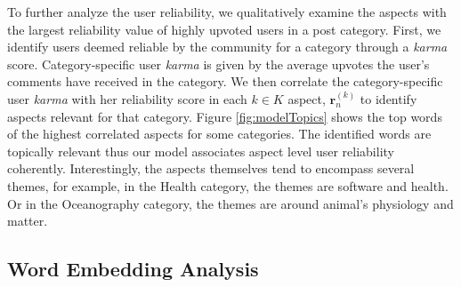 To further analyze the user reliability, we qualitatively examine the aspects with the largest reliability value of highly upvoted users in a post category. First, we identify users deemed reliable by the community for a category through a \emph{karma} score. Category-specific user \textit{karma} is given by the average upvotes the user's comments have received in the category.  We then correlate the category-specific user \textit{karma} with her reliability score in each $k \in K$ aspect, $\bm{r}_n^{(k)}$ to identify aspects relevant for that category.
Figure \ref{fig:modelTopics} shows the top words of the highest correlated aspects for some categories. The identified words are topically relevant thus our model associates aspect level user reliability coherently.
Interestingly, the aspects themselves tend to encompass several themes, for example, in the Health category, the themes are software and health. Or in the Oceanography category, the themes are around animal's physiology and matter.

\subsection{Word Embedding Analysis}

